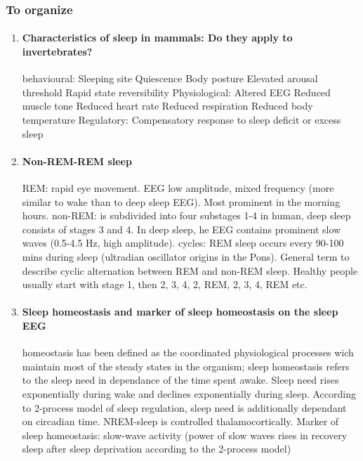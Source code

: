 \documentclass[12pt,article,oneside,a4paper]{memoir}
\begin{document}
\subsubsection{To organize}
\begin{enumerate}
\item \paragraph{Characteristics of sleep in mammals: Do they apply to invertebrates?}
behavioural:
Sleeping site 
Quiescence
Body posture
Elevated arousal threshold
Rapid state reversibility
Physiological:
Altered EEG
Reduced muscle tone
Reduced heart rate
Reduced respiration
Reduced body temperature
Regulatory:
Compensatory response to sleep deficit or excess sleep

\item \paragraph{Non-REM-REM sleep}

REM: rapid eye movement. EEG low amplitude, mixed frequency (more similar to wake than to deep sleep EEG). Most prominent in the morning hours.
non-REM: is subdivided into four substages 1-4 in human, deep sleep consists of stages 3 and 4. In deep sleep, he EEG contains prominent slow waves (0.5-4.5 Hz, high amplitude).
cycles: REM sleep occurs every 90-100 mins during sleep (ultradian oscillator origins in the Pons). General term to describe cyclic alternation between REM and non-REM sleep. Healthy people usually start with stage 1, then 2, 3, 4, 2, REM, 2, 3, 4, REM etc.

\item \paragraph{Sleep homeostasis and marker of sleep homeostasis on the sleep EEG}

homeostasis has been defined as the coordinated physiological processes wich maintain most of the steady states in the organism; sleep homeostasis refers to the sleep need in dependance of the time spent awake. Sleep need rises exponentially during wake and declines exponentially during sleep. According to 2-process model of sleep regulation, sleep need is additionally dependant on circadian time.
	NREM-sleep is controlled thalamocortically.
        	Marker of sleep homeostasis: slow-wave activity (power of slow waves rises in recovery sleep after sleep deprivation according to the 2-process model)
        	

\end{enumerate}
\end{document}

